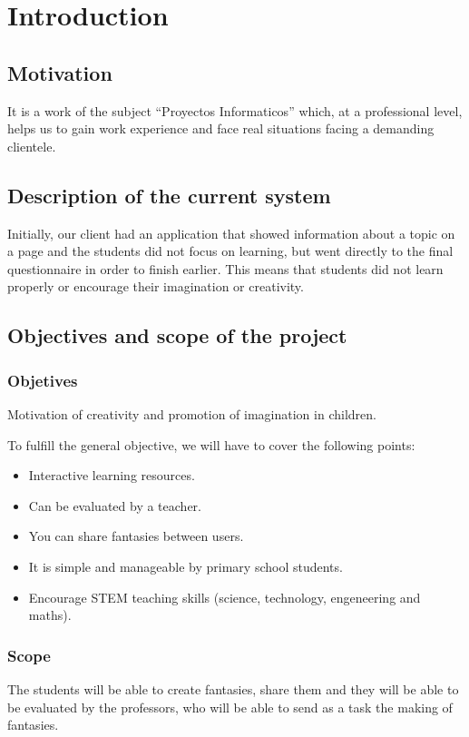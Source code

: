 \chapter{Introduction}
\section{Motivation}
It is a work of the subject ``Proyectos Informaticos'' which, at a professional level, helps us to gain work experience and face real situations facing a demanding clientele.

\section{Description of the current system}
Initially, our client had an application that showed information about a topic on a page and the students did not focus on learning, but went directly to the final questionnaire in order to finish earlier. This means that students did not learn properly or encourage their imagination or creativity.

\section{Objectives and scope of the project}
\subsection{Objetives}
Motivation of creativity and promotion of imagination in children.

To fulfill the general objective, we will have to cover the following points:
\begin{itemize}
	\item Interactive learning resources.
	\item Can be evaluated by a teacher.
	\item You can share fantasies between users.
	\item It is simple and manageable by primary school students.
	\item Encourage STEM teaching skills (science, technology, engeneering and maths).
\end{itemize}

\subsection{Scope}
The students will be able to create fantasies, share them and they will be able to be evaluated by the professors, who will be able to send as a task the making of fantasies.

